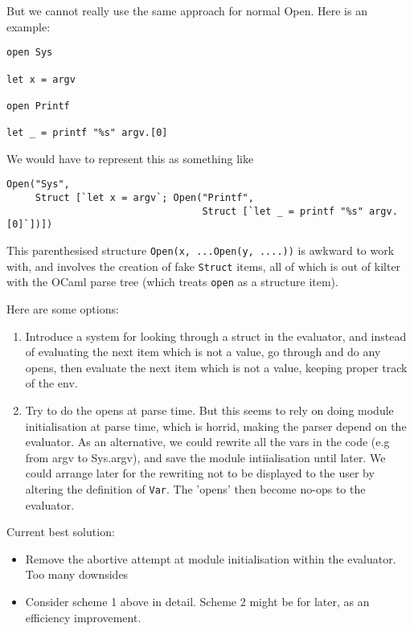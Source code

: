 \documentclass[10pt]{article}
\begin{document}
But we cannot really use the same approach for normal Open. Here is an example:

\begin{verbatim}
open Sys

let x = argv

open Printf

let _ = printf "%s" argv.[0]
\end{verbatim}

We would have to represent this as something like

\begin{verbatim}
Open("Sys",
     Struct [`let x = argv`; Open("Printf",
                                  Struct [`let _ = printf "%s" argv.[0]`])])
\end{verbatim}

This parenthesised structure \texttt{Open(x, ...Open(y, ....))} is awkward to work with, and involves the creation of fake \texttt{Struct} items, all of which is out of kilter with the OCaml parse tree (which treats \texttt{open} as a structure item).

Here are some options:

\begin{enumerate}
\item Introduce a system for looking through a struct in the evaluator, and instead of evaluating the next item which is not a value, go through and do any opens, then evaluate the next item which is not a value, keeping proper track of the env.
\item Try to do the opens at parse time. But this seems to rely on doing module initialisation at parse time, which is horrid, making the parser depend on the evaluator. As an alternative, we could rewrite all the vars in the code (e.g from argv to Sys.argv), and save the module intiialisation until later. We could arrange later for the rewriting not to be displayed to the user by altering the definition of \texttt{Var}. The 'opens' then become no-ops to the evaluator.
\end{enumerate}

Current best solution:

\begin{itemize}
\item Remove the abortive attempt at module initialisation within the evaluator. Too many downsides
\item Consider scheme 1 above in detail. Scheme 2 might be for later, as an efficiency improvement.
\end{itemize}
\end{document}
